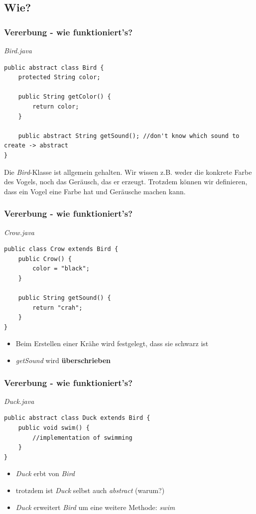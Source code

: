 \documentclass[18pt]{beamer}
\begin{document}
\subsection{Wie?}
\begin{frame}[containsverbatim]
	\frametitle{Vererbung - wie funktioniert's?}
	\emph{Bird.java}
	\begin{lstlisting}
public abstract class Bird {
	protected String color;

	public String getColor() {
		return color; 
	}
	
	public abstract String getSound(); //don't know which sound to create -> abstract
}
	\end{lstlisting}
	
	Die \emph{Bird}-Klasse ist allgemein gehalten. Wir wissen z.B. weder die konkrete Farbe des Vogels, noch das Geräusch, das er erzeugt. Trotzdem können wir definieren, dass ein Vogel eine Farbe hat und Geräusche machen kann.
\end{frame}


\begin{frame}[containsverbatim]
	\frametitle{Vererbung - wie funktioniert's?}
	\emph{Crow.java}
	\begin{lstlisting}
public class Crow extends Bird {
	public Crow() {
		color = "black";
	}

	public String getSound() {
		return "crah";
	}
}
	\end{lstlisting}
	
	\begin{itemize}
		\item Beim Erstellen einer Krähe wird festgelegt, dass sie schwarz ist
		\item \emph{getSound} wird \textbf{überschrieben}
	\end{itemize}
\end{frame}


\begin{frame}[containsverbatim]
	\frametitle{Vererbung - wie funktioniert's?}
	\emph{Duck.java}
	\begin{lstlisting}
public abstract class Duck extends Bird {
	public void swim() {
		//implementation of swimming
	}
}
	\end{lstlisting}
	
	\begin{itemize}
		\item \emph{Duck} erbt von \emph{Bird}
		\item trotzdem ist \emph{Duck} selbst auch \emph{abstract} (warum?)
		\item \emph{Duck} erweitert \emph{Bird} um eine weitere Methode: \emph{swim}
	\end{itemize}
\end{frame}
\end{document}
